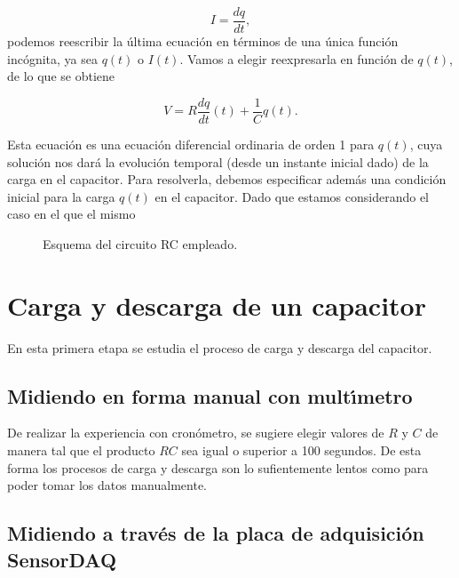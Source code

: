 \documentclass[laboratorio]{guia}
\begin{document}
$$ I = \frac{dq}{dt}, $$
podemos reescribir la \'ultima ecuaci\'on en t\'erminos de una \'unica
funci\'on inc\'ognita, ya sea $q(t)$ o $I(t)$. Vamos a elegir reexpresarla en
funci\'on de $q(t)$, de lo que se obtiene

\begin{equation}
    V = R \frac{dq}{dt}(t) + \frac{1}{C} q(t).
\end{equation}

Esta ecuaci\'on es una ecuaci\'on diferencial ordinaria de orden 1 para $q(t)$, 
cuya soluci\'on nos dar\'a la evoluci\'on temporal (desde un instante inicial
dado) de la carga en el capacitor. 
Para resolverla, debemos especificar adem\'as una condici\'on inicial para la 
carga $q(t)$ en el capacitor. Dado que estamos considerando el caso en el que
el mismo 

\begin{figure}[t!]
    \centering
    \vspace{0.5cm}
    \caption{Esquema del circuito RC empleado.}
    \label{fig:circuitoRC}
\end{figure}

\section{Carga y descarga de un capacitor}

En esta primera etapa se estudia el proceso de carga y descarga del capacitor. 

\subsection{Midiendo en forma manual con mult\'\i metro}

De realizar la experiencia con cron\'ometro, se sugiere elegir valores de $R$ y
$C$ de manera tal que el producto $RC$ sea igual o superior a 100 segundos. De
esta forma los procesos de carga y descarga son lo sufientemente lentos como
para poder tomar los datos manualmente. 

\subsection{Midiendo a trav\'es de la placa de adquisici\'on SensorDAQ}
\end{document}
